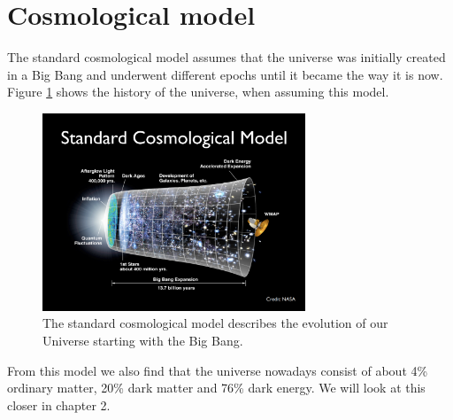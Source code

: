 \section{Cosmological model}
The standard cosmological model assumes that the universe was initially created in a Big Bang and underwent different epochs until it became the way it is now. Figure \ref{fig:standardcosmologicalmodel} shows the history of the universe, when assuming this model. 
\begin{figure}[H]
	\centering
		\includegraphics[width=0.7\textwidth]{img/ch-01/standardcosmologicalmodel.png}
		\caption{The standard cosmological model describes the evolution of our Universe starting with the Big Bang.}
		\label{fig:standardcosmologicalmodel}
\end{figure}
From this model we also find that the universe nowadays consist of about 4\% ordinary matter, 20\% dark matter and 76\% dark energy. We will look at this closer in chapter 2. 

